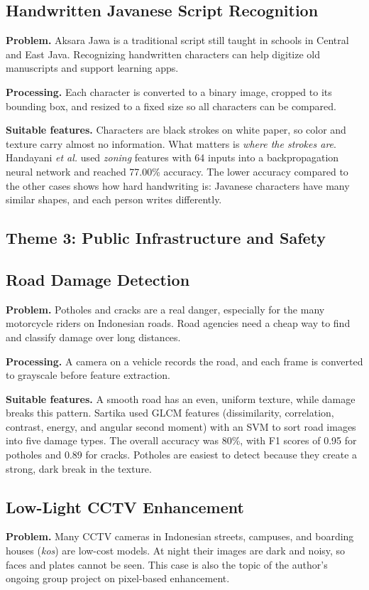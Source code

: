 \documentclass[conference]{IEEEtran}
\begin{document}
\subsection{Handwritten Javanese Script Recognition}
\textbf{Problem.} Aksara Jawa is a traditional script still taught in schools in Central and East Java. Recognizing handwritten characters can help digitize old manuscripts and support learning apps.

\textbf{Processing.} Each character is converted to a binary image, cropped to its bounding box, and resized to a fixed size so all characters can be compared.

\textbf{Suitable features.} Characters are black strokes on white paper, so color and texture carry almost no information. What matters is \emph{where the strokes are}. Handayani \emph{et al.} \cite{handayani} used \emph{zoning} features with 64 inputs into a backpropagation neural network and reached 77.00\% accuracy. The lower accuracy compared to the other cases shows how hard handwriting is: Javanese characters have many similar shapes, and each person writes differently.

\subsection*{Theme 3: Public Infrastructure and Safety}

\subsection{Road Damage Detection}
\textbf{Problem.} Potholes and cracks are a real danger, especially for the many motorcycle riders on Indonesian roads. Road agencies need a cheap way to find and classify damage over long distances.

\textbf{Processing.} A camera on a vehicle records the road, and each frame is converted to grayscale before feature extraction.

\textbf{Suitable features.} A smooth road has an even, uniform texture, while damage breaks this pattern. Sartika \cite{sartika} used GLCM features (dissimilarity, correlation, contrast, energy, and angular second moment) with an SVM to sort road images into five damage types. The overall accuracy was 80\%, with F1 scores of 0.95 for potholes and 0.89 for cracks. Potholes are easiest to detect because they create a strong, dark break in the texture.

\subsection{Low-Light CCTV Enhancement}
\textbf{Problem.} Many CCTV cameras in Indonesian streets, campuses, and boarding houses (\emph{kos}) are low-cost models. At night their images are dark and noisy, so faces and plates cannot be seen. This case is also the topic of the author's ongoing group project on pixel-based enhancement.
\end{document}
